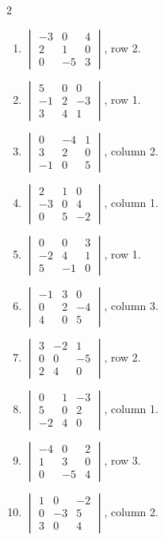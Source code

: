 \begin{multicols}{2}
\begin{enumerate}[label=\arabic*.,  leftmargin=*]
\item $\begin{vmatrix}-3&0&4\\2&1&0\\0&-5&3\end{vmatrix}$, \quad row 2.
\item $\begin{vmatrix}5&0&0\\-1&2&-3\\3&4&1\end{vmatrix}$, \quad row 1.
\item $\begin{vmatrix}0&-4&1\\3&2&0\\-1&0&5\end{vmatrix}$, \quad column 2.
\item $\begin{vmatrix}2&1&0\\-3&0&4\\0&5&-2\end{vmatrix}$, \quad column 1.
\item $\begin{vmatrix}0&0&3\\-2&4&1\\5&-1&0\end{vmatrix}$, \quad row 1.
\item $\begin{vmatrix}-1&3&0\\0&2&-4\\4&0&5\end{vmatrix}$, \quad column 3.
\item $\begin{vmatrix}3&-2&1\\0&0&-5\\2&4&0\end{vmatrix}$, \quad row 2.
\item $\begin{vmatrix}0&1&-3\\5&0&2\\-2&4&0\end{vmatrix}$, \quad column 1.
\item $\begin{vmatrix}-4&0&2\\1&3&0\\0&-5&4\end{vmatrix}$, \quad row 3.
\item $\begin{vmatrix}1&0&-2\\0&-3&5\\3&0&4\end{vmatrix}$, \quad column 2.

\end{enumerate}
\end{multicols}

